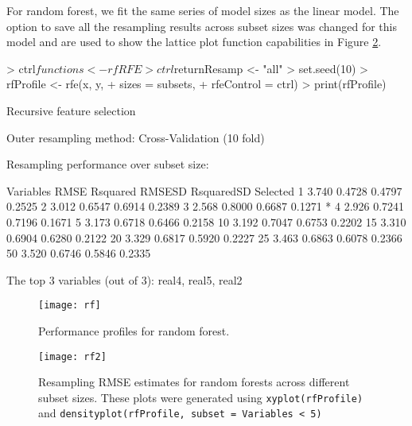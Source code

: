 \documentclass[12pt]{article}
\begin{document}
For random forest, we fit the same series of model sizes as the linear model. The option to save all the resampling results across subset sizes was changed for this model and are used to show the lattice plot function capabilities in Figure \ref{F:rf2}.
\begin{Schunk}
\begin{Sinput}
> ctrl$functions <- rfRFE
> ctrl$returnResamp <- "all"
> set.seed(10)
> rfProfile <- rfe(x, y,
+                  sizes = subsets,
+                  rfeControl = ctrl)
> print(rfProfile)
\end{Sinput}
\begin{Soutput}
Recursive feature selection

Outer resampling method: Cross-Validation (10 fold) 

Resampling performance over subset size:

 Variables  RMSE Rsquared RMSESD RsquaredSD Selected
         1 3.740   0.4728 0.4797     0.2525         
         2 3.012   0.6547 0.6914     0.2389         
         3 2.568   0.8000 0.6687     0.1271        *
         4 2.926   0.7241 0.7196     0.1671         
         5 3.173   0.6718 0.6466     0.2158         
        10 3.192   0.7047 0.6753     0.2202         
        15 3.310   0.6904 0.6280     0.2122         
        20 3.329   0.6817 0.5920     0.2227         
        25 3.463   0.6863 0.6078     0.2366         
        50 3.520   0.6746 0.5846     0.2335         

The top 3 variables (out of 3):
   real4, real5, real2
\end{Soutput}
\end{Schunk}

\begin{figure}
   \begin{center}		
      \texttt{[image: rf]}
      \caption{Performance profiles for random forest.}
      \label{F:rf} 
    \end{center}
\end{figure}

\begin{figure}
   \begin{center}		
      \texttt{[image: rf2]}
      \caption{Resampling RMSE estimates for random forests across different subset sizes. These plots were generated using \texttt{xyplot(rfProfile)} and \texttt{densityplot(rfProfile, subset = Variables < 5)}}
      \label{F:rf2} 
    \end{center}
\end{figure}
\end{document}
